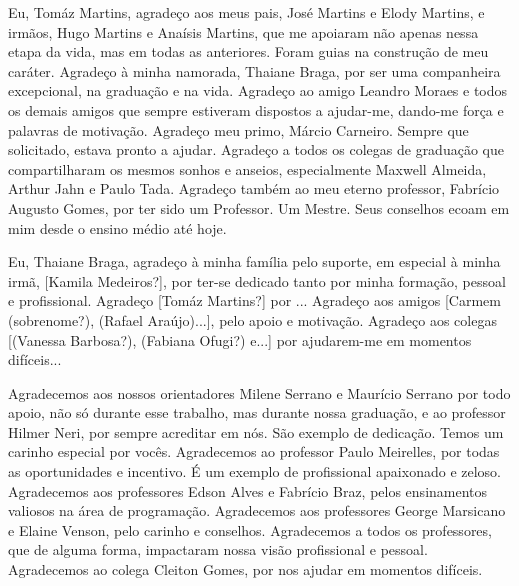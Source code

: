 \begin{agradecimentos}
Eu, Tomáz Martins, agradeço aos meus pais, José Martins e Elody Martins, e irmãos, Hugo Martins e Anaísis Martins, que me apoiaram não apenas nessa etapa da vida, mas em todas as anteriores. Foram guias na construção de meu caráter. Agradeço à minha namorada, Thaiane Braga, por ser uma companheira excepcional, na graduação e na vida. Agradeço ao amigo Leandro Moraes e todos os demais amigos que sempre estiveram dispostos a ajudar-me, dando-me força e palavras de motivação. Agradeço meu primo, Márcio Carneiro. Sempre que solicitado, estava pronto a ajudar. Agradeço a todos os colegas de graduação que compartilharam os mesmos sonhos e anseios, especialmente Maxwell Almeida, Arthur Jahn e Paulo Tada. Agradeço também ao meu eterno professor, Fabrício Augusto Gomes, por ter sido um Professor. Um Mestre. Seus conselhos ecoam em mim desde o ensino médio até hoje.

Eu, Thaiane Braga, agradeço à minha família pelo suporte, em especial à minha irmã, [Kamila Medeiros?], por ter-se dedicado tanto por minha formação, pessoal e profissional. Agradeço [Tomáz Martins?] por ... Agradeço aos amigos [Carmem (sobrenome?), (Rafael Araújo)...], pelo apoio e motivação. Agradeço aos colegas [(Vanessa Barbosa?), (Fabiana Ofugi?) e...] por ajudarem-me em momentos difíceis...

Agradecemos aos nossos orientadores Milene Serrano e Maurício Serrano por todo apoio, não só durante esse trabalho, mas durante nossa graduação, e ao professor Hilmer Neri, por sempre acreditar em nós. São exemplo de dedicação. Temos um carinho especial por vocês. Agradecemos ao professor Paulo Meirelles, por todas as oportunidades e incentivo. É um exemplo de profissional apaixonado e zeloso. Agradecemos aos professores Edson Alves e Fabrício Braz, pelos ensinamentos valiosos na área de programação. Agradecemos aos professores George Marsicano e Elaine Venson, pelo carinho e conselhos. Agradecemos a todos os professores, que de alguma forma, impactaram nossa visão profissional e pessoal. Agradecemos ao colega Cleiton Gomes, por nos ajudar em momentos difíceis.
\end{agradecimentos}
